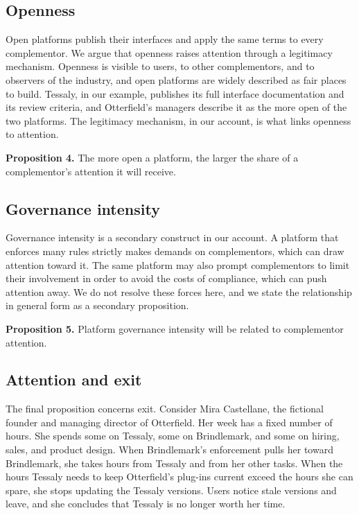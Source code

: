 \documentclass[12pt]{article}
\begin{document}
\subsection{Openness}

Open platforms publish their interfaces and apply the same terms to every complementor. We argue that openness raises attention through a legitimacy mechanism. Openness is visible to users, to other complementors, and to observers of the industry, and open platforms are widely described as fair places to build. Tessaly, in our example, publishes its full interface documentation and its review criteria, and Otterfield's managers describe it as the more open of the two platforms. The legitimacy mechanism, in our account, is what links openness to attention.

\textbf{Proposition 4.} The more open a platform, the larger the share of a complementor's attention it will receive.

\subsection{Governance intensity}

Governance intensity is a secondary construct in our account. A platform that enforces many rules strictly makes demands on complementors, which can draw attention toward it. The same platform may also prompt complementors to limit their involvement in order to avoid the costs of compliance, which can push attention away. We do not resolve these forces here, and we state the relationship in general form as a secondary proposition.

\textbf{Proposition 5.} Platform governance intensity will be related to complementor attention.

\subsection{Attention and exit}

The final proposition concerns exit. Consider Mira Castellane, the fictional founder and managing director of Otterfield. Her week has a fixed number of hours. She spends some on Tessaly, some on Brindlemark, and some on hiring, sales, and product design. When Brindlemark's enforcement pulls her toward Brindlemark, she takes hours from Tessaly and from her other tasks. When the hours Tessaly needs to keep Otterfield's plug-ins current exceed the hours she can spare, she stops updating the Tessaly versions. Users notice stale versions and leave, and she concludes that Tessaly is no longer worth her time.
\end{document}
